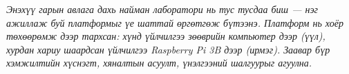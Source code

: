 \documentclass[11pt,a4paper,openany,oneside]{report}
\begin{document}
\begin{titlepage}
\vfill

\begin{minipage}{0.9\textwidth}
\small\itshape\color{cncmid}
Энэхүү гарын авлага дахь найман лаборатори нь тус тусдаа биш —
нэг ажиллаж буй платформыг үе шаттай өргөтгөж бүтээнэ. Платформ нь
хоёр төхөөрөмж дээр тархсан: хүнд үйлчилгээ зөөврийн компьютер дээр
(үүл), хурдан хариу шаардсан үйлчилгээ Raspberry Pi 3B дээр (ирмэг).
Заавар бүр хэмжилтийн хүснэгт, хяналтын асуулт, үнэлгээний шалгуурыг
агуулна.
\end{minipage}

\vspace{8mm}
\end{titlepage}

\setcounter{page}{1}

\hypersetup{linkcolor=cncblue}
\tableofcontents
\hypersetup{linkcolor=cncmid}

\cleardoublepage
{}
\setcounter{page}{1}













\appendix





\end{document}
